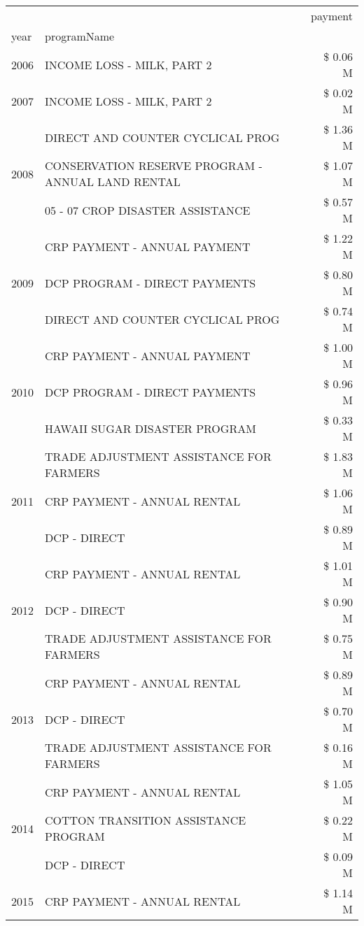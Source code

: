 \begin{tabular}{llr}
\toprule
 &  & payment \\
year & programName &  \\
\midrule
2006 & INCOME LOSS - MILK, PART 2 & \$ 0.06 M \\
\cline{1-3}
2007 & INCOME LOSS - MILK, PART 2 & \$ 0.02 M \\
\cline{1-3}
\multirow[t]{3}{*}{2008} & DIRECT AND COUNTER CYCLICAL PROG & \$ 1.36 M \\
 & CONSERVATION RESERVE PROGRAM - ANNUAL LAND RENTAL & \$ 1.07 M \\
 & 05 - 07 CROP DISASTER ASSISTANCE & \$ 0.57 M \\
\cline{1-3}
\multirow[t]{3}{*}{2009} & CRP PAYMENT - ANNUAL PAYMENT & \$ 1.22 M \\
 & DCP PROGRAM - DIRECT PAYMENTS & \$ 0.80 M \\
 & DIRECT AND COUNTER CYCLICAL PROG & \$ 0.74 M \\
\cline{1-3}
\multirow[t]{3}{*}{2010} & CRP PAYMENT - ANNUAL PAYMENT & \$ 1.00 M \\
 & DCP PROGRAM - DIRECT PAYMENTS & \$ 0.96 M \\
 & HAWAII SUGAR DISASTER PROGRAM & \$ 0.33 M \\
\cline{1-3}
\multirow[t]{3}{*}{2011} & TRADE ADJUSTMENT ASSISTANCE FOR FARMERS & \$ 1.83 M \\
 & CRP PAYMENT - ANNUAL RENTAL & \$ 1.06 M \\
 & DCP - DIRECT & \$ 0.89 M \\
\cline{1-3}
\multirow[t]{3}{*}{2012} & CRP PAYMENT - ANNUAL RENTAL & \$ 1.01 M \\
 & DCP - DIRECT & \$ 0.90 M \\
 & TRADE ADJUSTMENT ASSISTANCE FOR FARMERS & \$ 0.75 M \\
\cline{1-3}
\multirow[t]{3}{*}{2013} & CRP PAYMENT - ANNUAL RENTAL & \$ 0.89 M \\
 & DCP - DIRECT & \$ 0.70 M \\
 & TRADE ADJUSTMENT ASSISTANCE FOR FARMERS & \$ 0.16 M \\
\cline{1-3}
\multirow[t]{3}{*}{2014} & CRP PAYMENT - ANNUAL RENTAL & \$ 1.05 M \\
 & COTTON TRANSITION ASSISTANCE PROGRAM & \$ 0.22 M \\
 & DCP - DIRECT & \$ 0.09 M \\
\cline{1-3}
\multirow[t]{3}{*}{2015} & CRP PAYMENT - ANNUAL RENTAL & \$ 1.14 M \\

\end{tabular}
